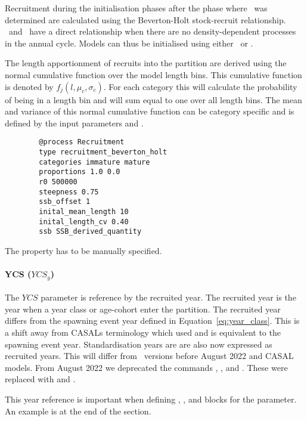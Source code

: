 Recruitment during the initialisation phases after the phase where \Bzero\ was determined are calculated using the Beverton-Holt stock-recruit relationship. \Rzero\ and \Bzero\ have a direct relationship when there are no density-dependent processes in the annual cycle. Models can thus be initialised using either \Bzero\ or \Rzero.

The length apportionment of recruits into the partition are derived using the normal cumulative function over the model length bins. This cumulative function is denoted by \(f_j(l,\mu_c, \sigma_c)\). For each category this will calculate the probability of being in a length bin and will  sum equal to one over all length bins. The mean and variance of this normal cumulative function can be category specific and is defined by the input parameters  and .

{\small{\begin{verbatim}
		@process Recruitment
		type recruitment_beverton_holt
		categories immature mature
		proportions 1.0 0.0
		r0 500000
		steepness 0.75
		ssb_offset 1
		inital_mean_length 10
		inital_length_cv 0.40
		ssb SSB_derived_quantity
		\end{verbatim}}}

The property  has to be manually specified.

\paragraph*{YCS ($YCS_y$)}

The $YCS$ parameter is reference by the recruited year. The recruited year is the year when a year class or age-cohort enter the partition. The recruited year differs from the spawning event year defined in Equation~\eqref{eq:year_class}. This is a shift away from CASALs terminology which used  and is equivalent to the spawning event year. Standardisation years are are also now expressed as recruited years. This will differ from \CNAME\ versions before August 2022 and CASAL models. From August 2022 we deprecated the commands , , and . These were replaced with  and .

This year reference is important when defining , , and  blocks for the  parameter. An example is at the end of the section.

